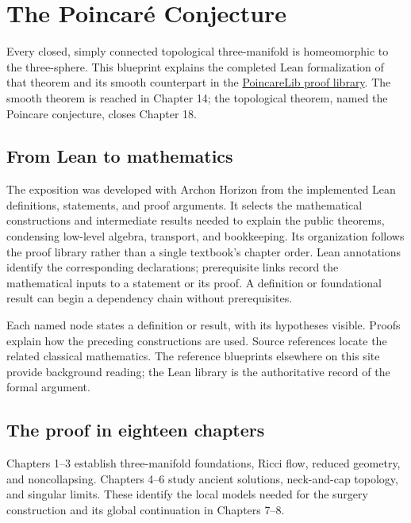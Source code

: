 

\chapter*{The Poincaré Conjecture}

Every closed, simply connected topological three-manifold is homeomorphic
to the three-sphere. This blueprint explains the completed Lean formalization
of that theorem and its smooth counterpart in the
\href{https://github.com/frenzymath/Poincare-Conjecture/tree/main/PoincareConjecture/PoincareLib}{PoincareLib proof library}.
The smooth theorem is reached in Chapter 14; the topological theorem, named
the Poincare conjecture, closes Chapter 18.

\section*{From Lean to mathematics}

The exposition was developed with Archon Horizon from the implemented Lean
definitions, statements, and proof arguments. It selects the mathematical
constructions and intermediate results needed to explain the public theorems,
condensing low-level algebra, transport, and bookkeeping. Its organization
follows the proof library rather than a single textbook's chapter order.
Lean annotations identify the corresponding declarations; prerequisite links
record the mathematical inputs to a statement or its proof. A definition or
foundational result can begin a dependency chain without prerequisites.

Each named node states a definition or result, with its hypotheses visible.
Proofs explain how the preceding constructions are used. Source references
locate the related classical mathematics. The reference blueprints elsewhere
on this site provide background reading; the Lean library is the authoritative
record of the formal argument.

\section*{The proof in eighteen chapters}

Chapters 1--3 establish three-manifold foundations, Ricci flow, reduced
geometry, and noncollapsing. Chapters 4--6 study ancient solutions,
neck-and-cap topology, and singular limits. These identify the local models
needed for the surgery construction and its global continuation in
Chapters 7--8.

